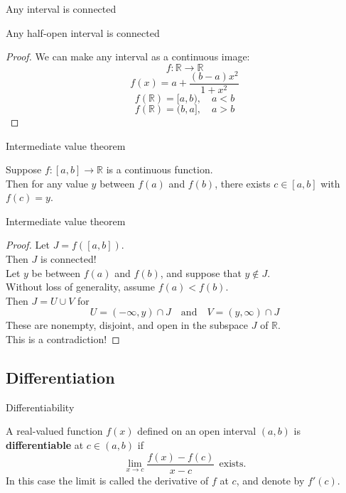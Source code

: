 \documentclass{beamer}
\begin{document}
\begin{frame}{Any interval is connected}
\begin{thm}
Any half-open interval is connected
\end{thm}
\pause
\begin{proof}
\pause
We can make any interval as a continuous image:
$$f:\mathbb{R}\rightarrow\mathbb{R}$$
$$f(x) = a + \frac{(b-a)x^2}{1+x^2}$$
\pause
$$f(\mathbb{R}) = [a,b),\quad a < b$$
\pause
$$f(\mathbb{R}) = (b,a],\quad a > b$$
\end{proof}
\end{frame}

\begin{frame}{Intermediate value theorem}
\begin{thm}
Suppose $f: [a,b]\rightarrow\mathbb{R}$ is a continuous function.\\
Then for any value $y$ between $f(a)$ and $f(b)$, there exists $c\in [a,b]$ with $f(c) =y$.
\end{thm}
\end{frame}

\begin{frame}{Intermediate value theorem}
\begin{proof}
\pause
Let $J = f([a,b])$.\\
\pause
Then $J$ is connected!\\
\pause
Let $y$ be between $f(a)$ and $f(b)$, and suppose that $y\notin J$.\\
\pause
Without loss of generality, assume $f(a) < f(b)$.\\
\pause
Then $J = U\cup V$ for
$$U = (-\infty,y)\cap J\quad\text{and}\quad V = (y,\infty)\cap J$$
\pause
These are nonempty, disjoint, and open in the subspace $J$ of $\mathbb{R}$.\\
\pause
This is a contradiction!
\end{proof}
\end{frame}

\subsection{Differentiation}

\begin{frame}{Differentiability}
\begin{defn}
A real-valued function $f(x)$ defined on an open interval $(a,b)$ is \textbf{differentiable} at $c\in (a,b)$ if
$$\lim_{x\rightarrow c}\frac{f(x)-f(c)}{x-c}\ \ \text{exists}.$$
In this case the limit is called the derivative of $f$ at $c$, and denote by $f'(c)$.
\end{defn}
\end{frame}
\end{document}

